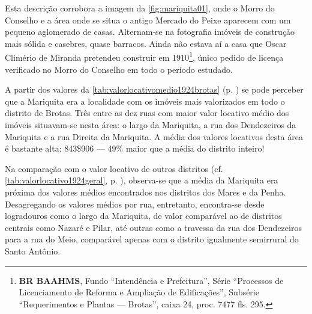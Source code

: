 



Esta descrição corrobora a imagem da \autoref{fig:mariquita01}, onde o Morro do Conselho e a área onde se situa o antigo Mercado do Peixe aparecem com um pequeno aglomerado de casas. Alternam-se na fotografia imóveis de construção mais sólida e casebres, quase barracos. Ainda não estava aí a casa que Oscar Climério de Miranda pretendeu construir em 1910\footnote{\textbf{BR BAAHMS}, Fundo ``Intendência e Prefeitura'', Série ``Processos de Licenciamento de Reforma e Ampliação de Edificações'', Subsérie ``Requerimentos e Plantas --- Brotas'', caixa 24, proc. 7477 fls. 295.}, único pedido de licença verificado no Morro do Conselho em todo o período estudado.


A partir dos valores da \autoref{tab:valorlocativomedio1924brotas} (p. \pageref{tab:valorlocativomedio1924brotas}) se pode perceber que a Mariquita era a localidade com os imóveis mais valorizados em todo o distrito de Brotas. Três entre as dez ruas com maior valor locativo médio dos imóveis situavam-se nesta área: o largo da Mariquita, a rua dos Dendezeiros da Mariquita e a rua Direita da Mariquita. A média dos valores locativos desta área é bastante alta: 843\$906 --- 49\% maior que a média do distrito inteiro! 

Na comparação com o valor locativo de outros distritos (cf. \autoref{tab:valorlocativo1924geral}, p. \pageref{tab:valorlocativo1924geral}), observa-se que a média da Mariquita era próxima dos valores médios encontrados nos distritos dos Mares e da Penha. Desagregando os valores médios por rua, entretanto, encontra-se desde logradouros como o largo da Mariquita, de valor comparável ao de distritos centrais como Nazaré e Pilar, até outras como a travessa da rua dos Dendezeiros para a rua do Meio, comparável apenas com o distrito igualmente semirrural do Santo Antônio.

